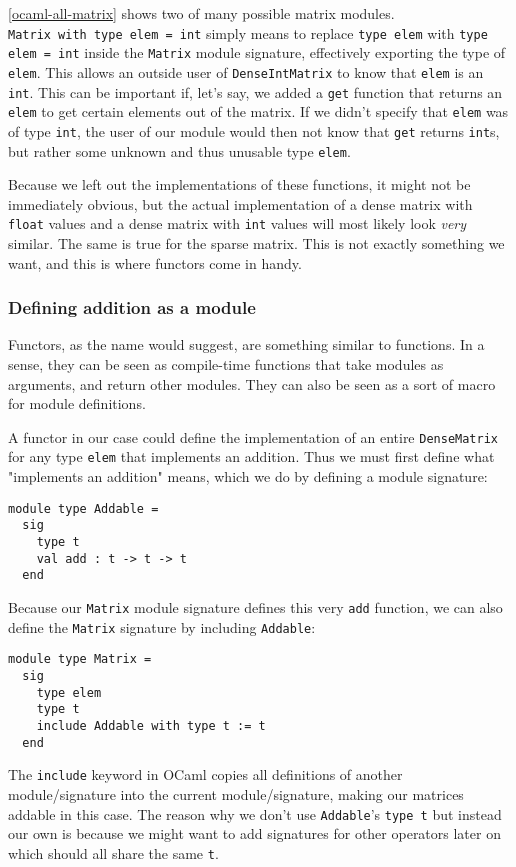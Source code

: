 \autoref{ocaml-all-matrix} shows two of many possible matrix modules. \\ \verb|Matrix with type elem = int| simply means to replace \verb|type elem| with \verb|type elem = int| inside the \verb|Matrix| module signature, effectively exporting the type of \verb|elem|. This allows an outside user of \verb|DenseIntMatrix| to know that \verb|elem| is an \verb|int|. This can be important if, let's say, we added a \verb|get| function that returns an \verb|elem| to get certain elements out of the matrix. If we didn't specify that \verb|elem| was of type \verb|int|, the user of our module would then not know that \verb|get| returns \verb|int|s, but rather some unknown and thus unusable type \verb|elem|.

Because we left out the implementations of these functions, it might not be immediately obvious, but the actual implementation of a dense matrix with \verb|float| values and a dense matrix with \verb|int| values will most likely look \textit{very} similar. The same is true for the sparse matrix. This is not exactly something we want, and this is where functors come in handy.

\subsubsection{Defining addition as a module}

Functors, as the name would suggest, are something similar to functions. In a sense, they can be seen as compile-time functions that take modules as arguments, and return other modules. They can also be seen as a sort of macro for module definitions.

A functor in our case could define the implementation of an entire \verb|DenseMatrix| for any type \verb|elem| that implements an addition. Thus we must first define what "implements an addition" means, which we do by defining a module signature:
\begin{verbatim}
module type Addable =
  sig
    type t
    val add : t -> t -> t
  end
\end{verbatim}
Because our \verb|Matrix| module signature defines this very \verb|add| function, we can also define the \verb|Matrix| signature by including \verb|Addable|:
\begin{verbatim}
module type Matrix =
  sig
    type elem
    type t
    include Addable with type t := t
  end
\end{verbatim}
The \verb|include| keyword in OCaml copies all definitions of another module/signature into the current module/signature, making our matrices addable in this case. The reason why we don't use \verb|Addable|'s \verb|type t| but instead our own is because we might want to add signatures for other operators later on which should all share the same \verb|t|.

